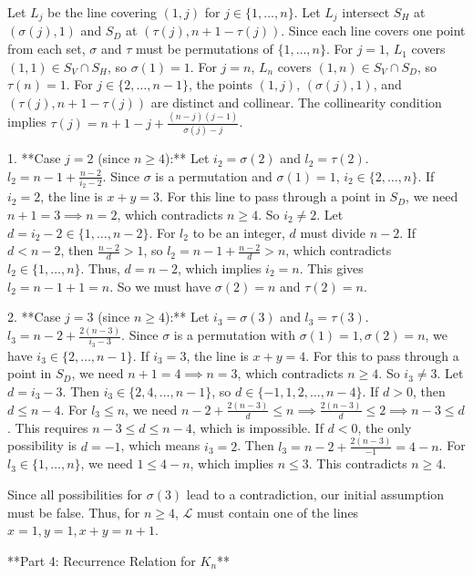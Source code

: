 Let $L_j$ be the line covering $(1,j)$ for $j \in \{1, \dots, n\}$. Let $L_j$ intersect $S_H$ at $(\sigma(j),1)$ and $S_D$ at $(\tau(j), n+1-\tau(j))$. Since each line covers one point from each set, $\sigma$ and $\tau$ must be permutations of $\{1, \dots, n\}$.
For $j=1$, $L_1$ covers $(1,1) \in S_V \cap S_H$, so $\sigma(1)=1$. For $j=n$, $L_n$ covers $(1,n) \in S_V \cap S_D$, so $\tau(n)=1$.
For $j \in \{2, \dots, n-1\}$, the points $(1,j)$, $(\sigma(j),1)$, and $(\tau(j), n+1-\tau(j))$ are distinct and collinear. The collinearity condition implies $\tau(j) = n+1-j + \frac{(n-j)(j-1)}{\sigma(j)-j}$.

1.  **Case $j=2$ (since $n \ge 4$):** Let $i_2=\sigma(2)$ and $l_2=\tau(2)$.
    $l_2 = n-1 + \frac{n-2}{i_2-2}$. Since $\sigma$ is a permutation and $\sigma(1)=1$, $i_2 \in \{2, \dots, n\}$.
    If $i_2=2$, the line is $x+y=3$. For this line to pass through a point in $S_D$, we need $n+1=3 \implies n=2$, which contradicts $n \ge 4$. So $i_2 \ne 2$.
    Let $d=i_2-2 \in \{1, \dots, n-2\}$. For $l_2$ to be an integer, $d$ must divide $n-2$. If $d < n-2$, then $\frac{n-2}{d} > 1$, so $l_2 = n-1 + \frac{n-2}{d} > n$, which contradicts $l_2 \in \{1, \dots, n\}$. Thus, $d=n-2$, which implies $i_2=n$. This gives $l_2 = n-1 + 1 = n$. So we must have $\sigma(2)=n$ and $\tau(2)=n$.

2.  **Case $j=3$ (since $n \ge 4$):** Let $i_3=\sigma(3)$ and $l_3=\tau(3)$.
    $l_3 = n-2 + \frac{2(n-3)}{i_3-3}$. Since $\sigma$ is a permutation with $\sigma(1)=1, \sigma(2)=n$, we have $i_3 \in \{2, \dots, n-1\}$.
    If $i_3=3$, the line is $x+y=4$. For this to pass through a point in $S_D$, we need $n+1=4 \implies n=3$, which contradicts $n \ge 4$. So $i_3 \ne 3$.
    Let $d=i_3-3$. Then $i_3 \in \{2, 4, \dots, n-1\}$, so $d \in \{-1, 1, 2, \dots, n-4\}$.
    If $d>0$, then $d \le n-4$. For $l_3 \le n$, we need $n-2 + \frac{2(n-3)}{d} \le n \implies \frac{2(n-3)}{d} \le 2 \implies n-3 \le d$. This requires $n-3 \le d \le n-4$, which is impossible.
    If $d<0$, the only possibility is $d=-1$, which means $i_3=2$. Then $l_3 = n-2 + \frac{2(n-3)}{-1} = 4-n$. For $l_3 \in \{1, \dots, n\}$, we need $1 \le 4-n$, which implies $n \le 3$. This contradicts $n \ge 4$.

Since all possibilities for $\sigma(3)$ lead to a contradiction, our initial assumption must be false. Thus, for $n \ge 4$, $\mathcal{L}$ must contain one of the lines $x=1, y=1, x+y=n+1$.

**Part 4: Recurrence Relation for $K_n$**

